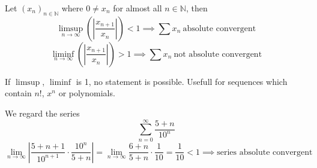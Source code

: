 \begin{proposition}\label{pro:ratio_test}
   Let \((x_n)_{n \in \mathbb{N}}\) where \(0 \neq x_n\) for almost all \(n \in \mathbb{N}\), then
   \[\limsup_{n \to \infty} \left(\left|\frac{x_{n+1}}{x_n}\right|\right) < 1 \implies \sum x_n~\text{absolute convergent}\]
   \[\liminf_{n \to \infty} \left(\left|\frac{x_{n+1}}{x_n}\right|\right) > 1 \implies \sum x_n~\text{not absolute convergent}\]
\end{proposition}
\begin{remark}
   If \(\limsup\), \(\liminf\) is 1, no statement is possible.
   Usefull for sequences which contain \(n!\), \(x^n\) or polynomials.
\end{remark}
\begin{example}
   We regard the series
   \[\sum_{n=0}^\infty \frac{5 + n}{10^n}\]
   \[\lim_{n \to \infty} \left|\frac{5 + n + 1}{10^{n+1}} \cdot \frac{10^n}{5 + n}\right| = \lim_{n \to \infty} \frac{6+n}{5+n} \cdot \frac{1}{10} = \frac{1}{10} < 1 \implies \text{series absolute convergent}\]
\end{example}

